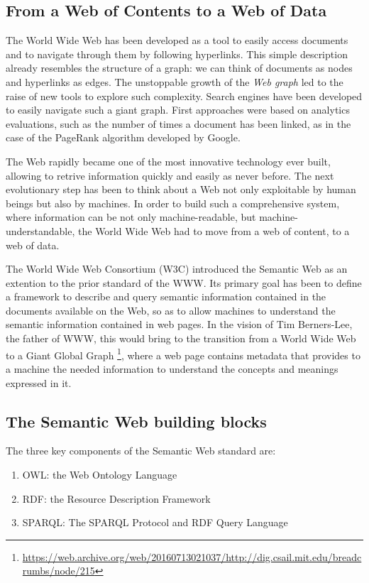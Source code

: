 \documentclass[%
    corpo=13.5pt,
    twoside,
    oldstyle,
    tipotesi=magistrale,
    greek,
    evenboxes
]{toptesi}
\begin{document}
\subsection{From a Web of Contents to a Web of Data}

The World Wide Web has been developed as a tool to easily access
documents and to navigate through them by following hyperlinks.
This simple description already resembles the structure of a graph: we can
think of documents as nodes and hyperlinks as edges. The unstoppable growth
of the \emph{Web graph} led to the raise of new tools to explore such
complexity. Search engines have been developed to easily navigate such a
giant graph. First approaches were based on analytics evaluations,
such as the number of times a document has been linked, as in the case of the
PageRank \cite{page1999} algorithm developed by Google.
\newline

The Web rapidly became one of the most innovative technology ever built,
allowing to retrive information quickly and easily as never before.
The next evolutionary step has been to think about a Web not only exploitable by
human beings but also by machines. In order to build such a comprehensive
system, where information can be not only machine-readable, but
machine-understandable, the World Wide Web had to move from a web of content, to
a web of data.
\newline

The World Wide Web Consortium (W3C) introduced the Semantic Web as an extention
to the prior standard of the WWW. Its primary goal has been
to define a framework to describe and query semantic information contained
in the documents available on the Web, so as to allow machines to understand
the semantic information contained in web pages. In the vision of Tim
Berners-Lee, the father of WWW, this would bring to the transition from a
World Wide Web to a Giant Global Graph
\footnote{\url{https://web.archive.org/web/20160713021037/http://dig.csail.mit.edu/breadcrumbs/node/215}},
where a web page contains metadata that provides to a machine the needed
information to understand the concepts and meanings expressed in it.


\subsection{The Semantic Web building blocks}
\label{subsec:semanticweb}

The three key components of the Semantic Web standard are:
\begin{enumerate}
\item OWL: the Web Ontology Language\cite{mcguinness2004}
\item RDF: the Resource Description Framework\cite{lassila1998}
\item SPARQL: The SPARQL Protocol and RDF Query Language
\end{enumerate}
\bigskip
\end{document}

